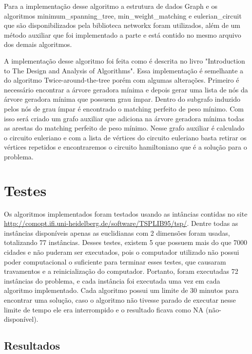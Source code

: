 \documentclass[12pt]{article}
\begin{document}
Para a implementação desse algoritmo a estrutura de dados Graph e os algoritmos minimum\_spanning\_tree, min\_weight\_matching e eulerian\_circuit que são disponibilizados pela biblioteca networkx foram utilizados, além de um método auxiliar que foi implementado a parte e está contido no mesmo arquivo dos demais algoritmos.

A implementação desse algoritmo foi feita como é descrita no livro "Introduction to The Design and Analysis of Algorithms". Essa implementação é semelhante a do algoritmo Twice-around-the-tree porém com algumas alterações. Primeiro é necessário encontrar a árvore geradora mínima e depois gerar uma lista de nós da árvore geradora mínima que possuem grau ímpar. Dentro do subgrafo induzido pelos nós de grau ímpar é encontrado o matching perfeito de peso mínimo. Com isso será criado um grafo auxiliar que adiciona na árvore geradora mínima todas as arestas do matching perfeito de peso mínimo. Nesse grafo auxiliar é calculado o circuito euleriano e com a lista de vértices do circuito euleriano basta retirar os vértices repetidos e encontraremos o circuito hamiltoniano que é a solução para o problema.

\section{Testes}

Os algoritmos implementados foram testados usando as intâncias contidas no site \href{http://comopt.ifi.uni-heidelberg.de/software/TSPLIB95/tsp/}{http://comopt.ifi.uni-heidelberg.de/software/TSPLIB95/tsp/}. Dentre todas as instâncias disponíveis apenas as euclidianas com 2 dimensões foram usadas, totalizando 77 instâncias. Desses testes, existem 5 que possuem mais do que 7000 cidades e não puderam ser executados, pois o computador utilizado não possui poder computacional o suficiente para terminar esses testes, que causaram travamentos e a reinicialização do computador. Portanto, foram executadas 72 instâncias do problema, e cada instância foi executada uma vez em cada algoritmo implementado. Cada algoritmo possui um limite de 30 minutos para encontrar uma solução, caso o algoritmo não tivesse parado de executar nesse limite de tempo ele era interrompido e o resultado ficava como NA (não-disponível).

\subsection{Resultados}
\end{document}
